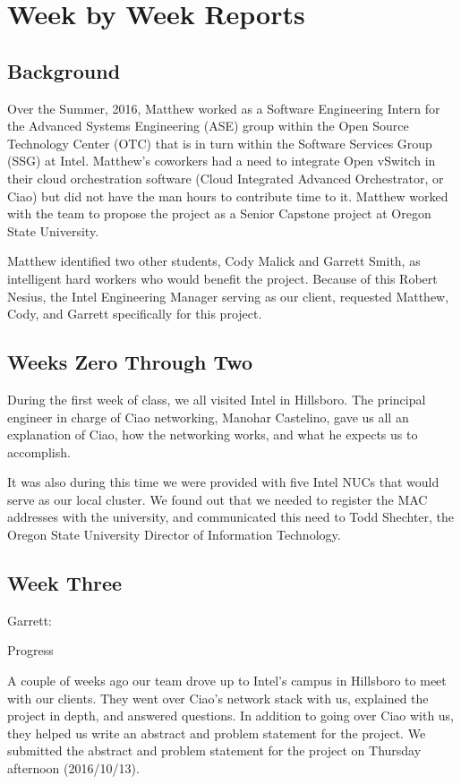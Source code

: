 \documentclass[10pt,onecolumn,journal,draftclsnofoot]{IEEEtran}
\begin{document}
\section{Week by Week Reports}

\subsection{Background}

Over the Summer, 2016, Matthew worked as a Software Engineering Intern for the
Advanced Systems Engineering (ASE) group within the Open Source Technology
Center (OTC) that is in turn within the Software Services Group (SSG) at Intel.
Matthew's coworkers had a need to integrate Open vSwitch in their cloud
orchestration software (Cloud Integrated Advanced Orchestrator, or Ciao) but did
not have the man hours to contribute time to it. Matthew worked with the team to
propose the project as a Senior Capstone project at Oregon State University.

Matthew identified two other students, Cody Malick and Garrett Smith, as
intelligent hard workers who would benefit the project. Because of this Robert
Nesius, the Intel Engineering Manager serving as our client, requested Matthew,
Cody, and Garrett specifically for this project.

\subsection{Weeks Zero Through Two}

During the first week of class, we all visited Intel in Hillsboro. The principal
engineer in charge of Ciao networking, Manohar Castelino, gave us all an
explanation of Ciao, how the networking works, and what he expects us to
accomplish.

It was also during this time we were provided with five Intel NUCs that would
serve as our local cluster. We found out that we needed to register the MAC
addresses with the university, and communicated this need to Todd Shechter, the
Oregon State University Director of Information Technology.


\subsection{Week Three}

Garrett:

Progress

A couple of weeks ago our team drove up to Intel's campus in Hillsboro to meet
with our clients.
They went over Ciao's network stack with us, explained the project in depth, and
answered questions. In addition to going over Ciao with us, they helped us write
an abstract and problem statement for the project. We submitted the abstract and
problem statement for the project on Thursday afternoon (2016/10/13).
\end{document}
